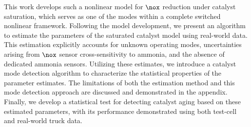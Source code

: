 This work develops such a nonlinear model for $\nox$ reduction under catalyst saturation, which serves as one of
the modes within a complete switched nonlinear framework. Following the model development, we present an algorithm to
estimate the parameters of the saturated catalyst model using real-world data. This estimation explicitly accounts for
unknown operating modes, uncertainties arising from $\nox$ sensor cross-sensitivity to ammonia, and the absence of
dedicated ammonia sensors. Utilizing these estimates, we introduce a catalyst mode detection algorithm to characterize
the statistical properties of the parameter estimates. The limitations of both the estimation method and this mode
detection approach are discussed and demonstrated in the appendix. Finally, we develop a statistical test for detecting
catalyst aging based on these estimated parameters, with its performance demonstrated using both test-cell and
real-world truck data.
